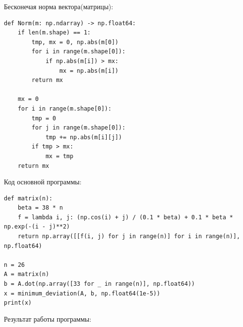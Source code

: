 \documentclass[a4paper,12pt]{report} %
\begin{document}
Бесконечая норма вектора(матрицы):

\begin{lstlisting}
def Norm(m: np.ndarray) -> np.float64:
    if len(m.shape) == 1:
        tmp, mx = 0, np.abs(m[0])
        for i in range(m.shape[0]):
            if np.abs(m[i]) > mx:
                mx = np.abs(m[i])
        return mx

    mx = 0
    for i in range(m.shape[0]):
        tmp = 0
        for j in range(m.shape[0]):
            tmp += np.abs(m[i][j])
        if tmp > mx:
            mx = tmp
    return mx
\end{lstlisting}

Код основной программы:

\begin{lstlisting}
def matrix(n):
    beta = 38 * n
    f = lambda i, j: (np.cos(i) + j) / (0.1 * beta) + 0.1 * beta * np.exp(-(i - j)**2)
    return np.array([[f(i, j) for j in range(n)] for i in range(n)], np.float64)

n = 26
A = matrix(n)
b = A.dot(np.array([33 for _ in range(n)], np.float64))
x = minimum_deviation(A, b, np.float64(1e-5))
print(x)
\end{lstlisting}

Результат работы программы:

\begin{gather*}
	[32.99977437, 33.0004763 , 32.99945582, 33.00066142, 32.99947897,\\
       33.00053767, 32.99971532, 33.00031782, 32.99993953, 33.0001698 ,\\
       33.00005689, 33.00011429, 33.00009631, 33.00009634, 33.00011434,\\
       33.00005693, 33.00016975, 32.9999395 , 33.0003177 , 32.99971541,\\
       33.00053757, 32.99947915, 33.0006612 , 32.9994559 , 33.00047608,\\
       32.99977439]
\end{gather*}
\end{document}

